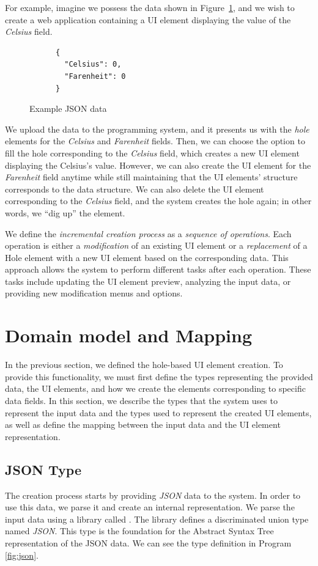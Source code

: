 For example, imagine we possess the data shown in Figure~\ref{fig:part-json}, and we wish to create a web application containing a UI element displaying the value of the \emph{Celsius} field.
\begin{figure}[htbp]
	\begin{lstlisting} 
      {
        "Celsius": 0,
        "Farenheit": 0
      }
    \end{lstlisting}
	\caption{Example JSON data}\label{fig:part-json}
\end{figure}
We upload the data to the programming system, and it presents us with the \emph{hole} elements for the \emph{Celsius} and \emph{Farenheit} fields.
Then, we can choose the option to fill the hole corresponding to the \emph{Celsius} field, which creates a new UI element displaying the Celsius's value.
However, we can also create the UI element for the \emph{Farenheit} field anytime while still maintaining that the UI elements' structure corresponds to the data structure.
We can also delete the UI element corresponding to the \emph{Celsius} field, and the system creates the hole again; in other words, we ``dig up'' the element.

We define the \emph{incremental creation process} as a \emph{sequence of operations}.
Each operation is either a \emph{modification} of an existing UI element or a \emph{replacement} of a Hole element with a new UI element based on the corresponding data.
This approach allows the system to perform different tasks after each operation.
These tasks include updating the UI element preview, analyzing the input data, or providing new modification menus and options.

\section{Domain model and Mapping}
\label{sec:types}

In the previous section, we defined the hole-based UI element creation. To provide this functionality, we must first define the types representing the provided data, the UI elements, and how we create the elements corresponding to specific data fields.
In this section, we describe the types that the system uses to represent the input data and the types used to represent the created UI elements,
as well as define the mapping between the input data and the UI element representation.


\subsection{JSON Type}
\label{sub:json}
The creation process starts by providing \emph{JSON} data to the system.
In order to use this data, we parse it and create an internal representation.
We parse the input data using a library called \citet{simpleJson}.
The library defines a discriminated union type named \emph{JSON}.
This type is the foundation for the Abstract Syntax Tree representation of the JSON data.
We can see the type definition in Program \ref{fig:json}.


